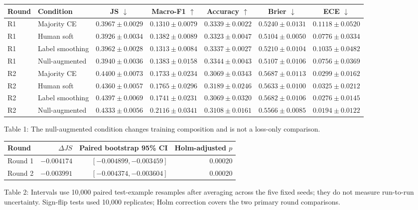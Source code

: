 \documentclass[11pt,a4paper]{article}
\begin{document}
\begin{center}\footnotesize
\setlength{\tabcolsep}{4pt}
\begin{tabular}{llccccc}
\toprule
Round & Condition & JS $\downarrow$ & Macro-F1 $\uparrow$ & Accuracy $\uparrow$ & Brier $\downarrow$ & ECE $\downarrow$\\
\midrule
R1 & Majority CE & $0.3967\pm0.0029$ & $0.1310\pm0.0079$ & $0.3339\pm0.0022$ & $0.5240\pm0.0131$ & $0.1118\pm0.0520$\\
R1 & Human soft & $0.3926\pm0.0034$ & $0.1382\pm0.0089$ & $0.3323\pm0.0047$ & $0.5104\pm0.0050$ & $0.0776\pm0.0334$\\
R1 & Label smoothing & $0.3962\pm0.0028$ & $0.1313\pm0.0084$ & $0.3337\pm0.0027$ & $0.5210\pm0.0104$ & $0.1035\pm0.0482$\\
R1 & Null-augmented & $0.3940\pm0.0036$ & $0.1383\pm0.0158$ & $0.3344\pm0.0043$ & $0.5107\pm0.0106$ & $0.0756\pm0.0369$\\
R2 & Majority CE & $0.4400\pm0.0073$ & $0.1733\pm0.0234$ & $0.3069\pm0.0343$ & $0.5687\pm0.0113$ & $0.0299\pm0.0162$\\
R2 & Human soft & $0.4360\pm0.0057$ & $0.1765\pm0.0296$ & $0.3189\pm0.0246$ & $0.5633\pm0.0100$ & $0.0325\pm0.0212$\\
R2 & Label smoothing & $0.4397\pm0.0069$ & $0.1741\pm0.0231$ & $0.3069\pm0.0320$ & $0.5682\pm0.0106$ & $0.0276\pm0.0145$\\
R2 & Null-augmented & $0.4333\pm0.0056$ & $0.2116\pm0.0341$ & $0.3108\pm0.0161$ & $0.5566\pm0.0085$ & $0.0194\pm0.0122$\\
\bottomrule
\end{tabular}

{\scriptsize Table 1: The null-augmented condition changes training composition and is not a loss-only comparison.}
\end{center}

\begin{center}\footnotesize
\setlength{\tabcolsep}{5pt}
\begin{tabular}{lrrr}
\toprule
Round & $\Delta JS$ & Paired bootstrap 95\% CI & Holm-adjusted $p$\\
\midrule
Round 1 & $-0.004174$ & $[-0.004899,-0.003459]$ & $0.00020$\\
Round 2 & $-0.003991$ & $[-0.004374,-0.003604]$ & $0.00020$\\
\bottomrule
\end{tabular}

{\scriptsize Table 2: Intervals use 10,000 paired test-example resamples after averaging across the five fixed seeds; they do not measure run-to-run uncertainty. Sign-flip tests used 10,000 replicates; Holm correction covers the two primary round comparisons.}
\end{center}
\end{document}
